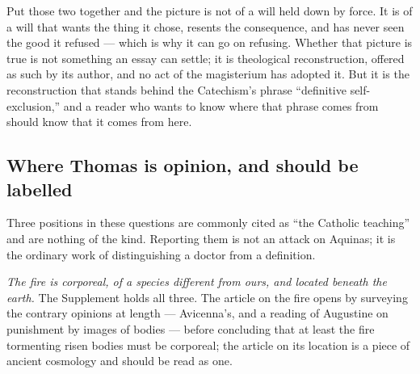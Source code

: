 Put those two together and the picture is not of a will held down by force. It is of a will that wants the thing it chose, resents the consequence, and has never seen the good it refused --- which is why it can go on refusing. Whether that picture is true is not something an essay can settle; it is theological reconstruction, offered as such by its author, and no act of the magisterium has adopted it. But it is the reconstruction that stands behind the Catechism's phrase ``definitive self-exclusion,'' and a reader who wants to know where that phrase comes from should know that it comes from here.

\subsection{Where Thomas is opinion, and should be labelled}

Three positions in these questions are commonly cited as ``the Catholic teaching'' and are nothing of the kind. Reporting them is not an attack on Aquinas; it is the ordinary work of distinguishing a doctor from a definition.

\emph{The fire is corporeal, of a species different from ours, and located beneath the earth.} The Supplement holds all three. The article on the fire opens by surveying the contrary opinions at length --- Avicenna's, and a reading of Augustine on punishment by images of bodies --- before concluding that at least the fire tormenting risen bodies must be corporeal; the article on its location is a piece of ancient cosmology and should be read as one.

